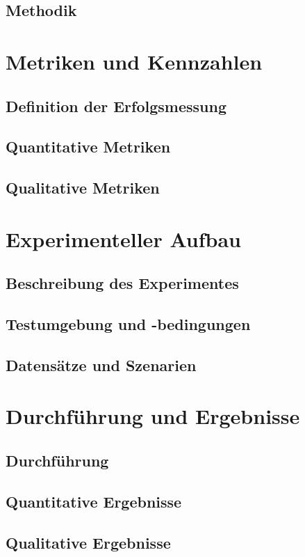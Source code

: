 \documentclass[a4paper,10pt,twoside]{report}
\begin{document}
\subsection{Methodik}

\section{Metriken und Kennzahlen}
\subsection{Definition der Erfolgsmessung}
\subsection{Quantitative Metriken}
\subsection{Qualitative Metriken}

\section{Experimenteller Aufbau}
\subsection{Beschreibung des Experimentes}
\subsection{Testumgebung und -bedingungen}
\subsection{Datensätze und Szenarien}

\section{Durchführung und Ergebnisse}
\subsection{Durchführung}
\subsection{Quantitative Ergebnisse}
\subsection{Qualitative Ergebnisse}
\end{document}
